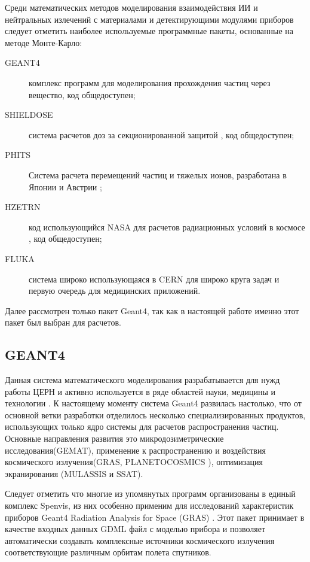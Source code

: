 Среди математических методов моделирования взаимодействия ИИ и нейтральных излечений с материалами и детектирующими модулями приборов следует отметить наиболее используемые программные пакеты, основанные на методе Монте-Карло:


\begin{description}
	\item[GEANT4] комплекс программ для моделирования прохождения частиц через вещество\cite{Allison2006},  код общедоступен;
	\item[SHIELDOSE ] система расчетов доз за секционированной защитой \cite{SeltzerS.M.1980},  код общедоступен;
	\item[PHITS] Система расчета перемещений частиц и тяжелых ионов, 
	разработана в Японии и Австрии \cite{Niita2006, Sato2006} ;
	\item[HZETRN] код использующийся NASA для расчетов радиационных условий в космосе \cite{Heinbockel2009},  код общедоступен;
	\item[FLUKA] система широко использующаяся в CERN для широко круга задач и 
	первую очередь для медицинских приложений\cite{Fasso2003, fluka2014}.
\end{description}

Далее рассмотрен только пакет Geant4, так как в настоящей работе именно этот пакет 
был выбран для расчетов. 


\subsection{GEANT4}

Данная система математического моделирования разрабатывается для нужд работы 
ЦЕРН и активно используется в ряде областей науки, медицины и технологии 
\cite{Agostinelli2003}.
К настоящему моменту система Geant4 развилась настолько, что от основной ветки 
разработки отделилось несколько специализированных продуктов, использующих 
только ядро системы для расчетов распространения частиц. Основные направления 
развития это микродозиметрические исследования(GEMAT), применение к 
распространению и 
воздействия космического излучения(GRAS, PLANETOCOSMICS ), оптимизация 
экранирования (MULASSIS \cite{Lei2002} и SSAT). 

Следует отметить что многие из упомянутых программ организованы в единый комплекс Spenvis,
 из них особенно применим для исследований характеристик приборов  Geant4 Radiation Analysis for Space (GRAS) \cite{Santin2005}. Этот пакет принимает в качестве входных данных GDML файл с моделью прибора и позволяет автоматически создавать комплексные источники космического излучения соответствующие различным орбитам полета спутников.

